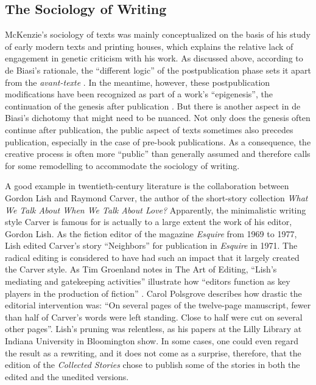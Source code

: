\begin{paper}
\section{The Sociology of Writing}

McKenzie's sociology of texts was mainly conceptualized on the basis of
his study of early modern texts and printing houses, which explains the
relative lack of engagement in genetic criticism with his work. As
discussed above, according to de Biasi's rationale, the ``different
logic'' of the postpublication phase sets it apart from the
\emph{avant-texte} \citep[40--41]{biasi_what_1996}. In the meantime, however, these
postpublication modifications have been recognized as part of a work's
``epigenesis'', the continuation of the genesis after publication \citep{van_hulle_modern_2014}. But there is another aspect in de Biasi's dichotomy that
might need to be nuanced. Not only does the genesis often continue after
publication, the public aspect of texts sometimes also precedes
publication, especially in the case of pre-book publications. As a
consequence, the creative process is often more ``public'' than generally
assumed and therefore calls for some remodelling to accommodate the
sociology of writing.

A good example in twentieth-century literature is the collaboration
between Gordon Lish and Raymond Carver, the author of the short-story
collection \emph{What We Talk About When We Talk About Love?}
Apparently, the minimalistic writing style Carver is famous for is
actually to a large extent the work of his editor, Gordon Lish. As the
fiction editor of the magazine \emph{Esquire} from 1969 to 1977, Lish
edited Carver's story ``Neighbors'' for publication in \emph{Esquire} in
1971. The radical editing is considered to have had such an impact that
it largely created the Carver style. As Tim Groenland notes in The Art of Editing, ``Lish’s mediating and gatekeeping activities'' illustrate how ``editors function as key players in the production of fiction'' \citep[xi]{groeland_art_2019}. Carol Polsgrove describes how
drastic the editorial intervention was: ``On several pages of the
twelve-page manuscript, fewer than half of Carver's words were left
standing. Close to half were cut on several other pages''\citep[241]{polsgrove_it_1995}. Lish's pruning was relentless, as his papers at the Lilly
Library at Indiana University in Bloomington show. In some cases, one
could even regard the result as a rewriting, and it does not come as a
surprise, therefore, that the \citeyear{carver_collected_2009} edition of the \emph{Collected
Stories} chose to publish some of the stories in both
the edited and the unedited versions.


\end{paper}
